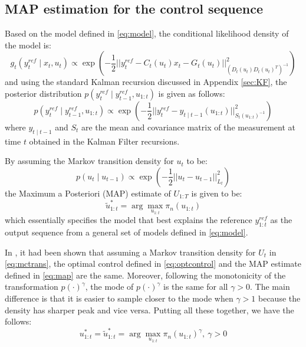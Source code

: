 \subsection{MAP estimation for the control sequence}
Based on the model defined in \eqref{eq:model}, the conditional likelihood density of the model is:
\begin{equation}
  g_t(y^{ref}_t \mid x_t, u_t) \propto \exp\left( -\dfrac{1}{2} \vert\vert y^{ref}_t - C_t(u_t)x_t - G_t(u_t) \vert\vert^2_{(D_t(u_t)D_t(u_t)^T)^{-1}}\right)
\end{equation}
and using the standard Kalman recursion discussed in Appendix \ref{sec:KF}, the posterior distribution $p(y^{ref}_t \mid y^{ref}_{t-1}, u_{1:t})$ is given as follows:
\begin{equation}
  p(y^{ref}_t \mid y^{ref}_{t-1}, u_{1:t}) \propto \exp\left( -\dfrac{1}{2} \vert\vert y^{ref}_t - y_{t \mid t-1}(u_{1:t}) \vert\vert^2_{S_t(u_{1:t})^{-1}}\right)
\end{equation}
where $y_{t \mid t-1}$ and $S_t$ are the mean and covariance matrix of the measurement at time $t$ obtained in the Kalman Filter recursions.

By assuming the Markov transition density for $u_t$ to be:
\begin{equation}
  p(u_{t} \mid u_{t-1}) \propto  \exp\left( -\dfrac{1}{2} \vert\vert u_t - u_{t-1} \vert\vert^2_{L_t}\right)
\label{eq:mctrans}
\end{equation}
the Maximum a Posteriori (MAP) estimate of $U_{1:T}$ is given to be:
\begin{equation}
  \tilde{u}^*_{1:t} = \arg\max_{u_{1:t}} \pi_n(u_{1:t})
\label{eq:map}
\end{equation}
which essentially specifies the model that best explains the reference $y^{ref}_{1:t}$ as the output sequence from a general set of models defined in \eqref{eq:model}.

In \cite{NK11}, it had been shown that assuming a Markov transition density for $U_t$ in \eqref{eq:mctrans}, the optimal control defined in \eqref{eq:optcontrol} and the MAP estimate defined in \eqref{eq:map} are the same. Moreover, following the monotonicity of the transformation $p(\cdot)^\gamma$, the mode of $p(\cdot)^\gamma$ is the same for all $\gamma > 0$. The main difference is that it is easier to sample closer to the mode when $\gamma > 1$ because the density has sharper peak and vice versa. Putting all these together, we have the follows:
\begin{equation}
  u^*_{1:t} = \tilde{u}^*_{1:t} = \arg\max_{u_{1:t}} \pi_n(u_{1:t})^\gamma,~\gamma > 0
\end{equation}

